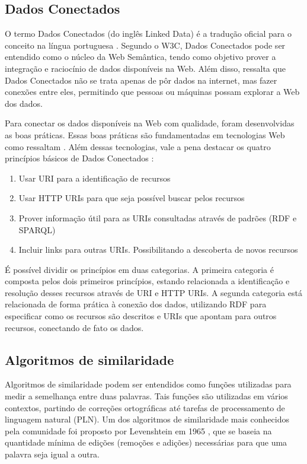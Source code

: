 \subsection{Dados Conectados}
O termo Dados Conectados (do inglês Linked Data) é a tradução oficial para o conceito na língua portuguesa \cite{Isotani2015}. Segundo o W3C, Dados Conectados pode ser entendido como o núcleo da Web Semântica, tendo como objetivo prover a integração e raciocínio de dados disponíveis na Web. Além disso,  ressalta que Dados Conectados não se trata apenas de pôr dados na internet, mas fazer conexões entre eles, permitindo que pessoas ou máquinas possam explorar a Web dos dados.

Para conectar os dados disponíveis na Web com qualidade, foram desenvolvidas as boas práticas. Essas boas práticas são fundamentadas em tecnologias Web como ressaltam . Além dessas tecnologias, vale a pena destacar os quatro princípios básicos de Dados Conectados \cite{berners2006linked}: 

\begin{enumerate}
	\item Usar URI para a identificação de recursos
	\item Usar HTTP URIs para que seja possível buscar pelos recursos 
	\item Prover informação útil para as URIs consultadas através de padrões (RDF e SPARQL) 
	\item Incluir links para outras URIs. Possibilitando a descoberta de novos recursos
\end{enumerate}

É possível dividir os princípios em duas categorias. A primeira categoria é composta pelos dois primeiros princípios, estando relacionada a identificação e resolução desses recursos através de URI e HTTP URIs. A segunda categoria está relacionada de forma prática à conexão dos dados, utilizando RDF para especificar como os recursos são descritos e URIs que apontam para outros recursos, conectando de fato os dados.

\subsection{Algoritmos de similaridade}

Algoritmos de similaridade podem ser entendidos como funções utilizadas para medir a semelhança entre duas palavras. Tais funções são utilizadas em vários contextos, partindo de correções ortográficas até tarefas de processamento de linguagem natural (PLN). Um dos algoritmos de similaridade mais conhecidos pela comunidade foi proposto por Levenshtein em 1965 \cite{levenshtein1966binary}, que se baseia na quantidade mínima de edições (remoções e adições) necessárias para que uma palavra seja igual a outra.  

